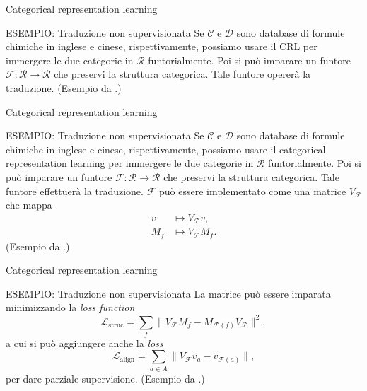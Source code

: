 \documentclass{beamer}
\begin{document}
\begin{frame}{Categorical representation learning}
    \begin{block}{ESEMPIO: Traduzione non supervisionata}
        Se $\mathcal{C}$ e $\mathcal{D}$ sono database di formule chimiche in inglese e cinese, rispettivamente, possiamo usare il CRL per immergere le due categorie in $\mathcal{R}$ funtorialmente. Poi si può imparare un funtore $\mathcal{F}: \mathcal{R} \to \mathcal{R}$ che preservi la struttura categorica. Tale funtore opererà la traduzione. (Esempio da \cite{sheshmani2021categorical}.)
    \end{block}
\end{frame}

\begin{frame}{Categorical representation learning}
    \begin{block}{ESEMPIO: Traduzione non supervisionata}
        Se $\mathcal{C}$ e $\mathcal{D}$ sono database di formule chimiche in inglese e cinese, rispettivamente, possiamo usare il categorical representation learning per immergere le due categorie in $\mathcal{R}$ funtorialmente. Poi si può imparare un funtore $\mathcal{F}: \mathcal{R} \to \mathcal{R}$ che preservi la struttura categorica. Tale funtore effettuerà la traduzione. $\mathcal{F}$ può essere implementato come una matrice $V_{\mathcal{F}}$ che mappa
        \begin{align*}
            v &\mapsto V_{\mathcal{F}}v,\\
            M_f &\mapsto V_{\mathcal{F}}M_f.
        \end{align*}
        (Esempio da \cite{sheshmani2021categorical}.)
    \end{block}
\end{frame}

\begin{frame}{Categorical representation learning}
    \begin{block}{ESEMPIO: Traduzione non supervisionata}
        La matrice può essere imparata minimizzando la \textit{loss function}
        \[\mathcal{L}_{\mathrm{struc}} = \sum_{f}\|V_{\mathcal{F}}M_f - M_{\mathcal{F}(f)}V_{\mathcal{F}}\|^2,\]
        a cui si può aggiungere anche la \textit{loss} 
        \[\mathcal{L}_{\mathrm{align}} = \sum_{a \in A}\|V_{\mathcal{F}}v_a - v_{\mathcal{F}(a)}\|,\]
        per dare parziale supervisione.
        (Esempio da \cite{sheshmani2021categorical}.)
    \end{block}
\end{frame}
\end{document}
